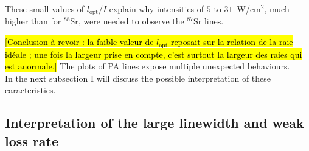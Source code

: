 These small values of $l_{\text{opt}}/I$ explain why intensities of $5$ to $31$~W/cm$^2$, much higher than for $^{88}\text{Sr}$, were needed to observe the $^{87}\text{Sr}$ lines. 

\hl{[Conclusion à revoir : la faible valeur de $l_{\text{opt}}$ reposait sur la relation de la raie idéale ; une fois la largeur prise en compte, c'est surtout la largeur des raies qui est anormale.]}
The plots of PA lines expose multiple unexpected behaviours.\\
In the next subsection I will discuss the possible interpretation of these caracteristics.

\subsection{Interpretation of the large linewidth and weak loss rate}

